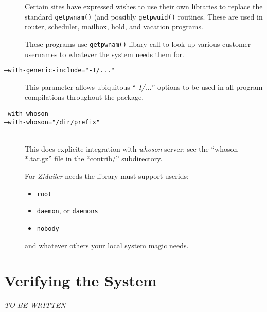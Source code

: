 \begin{description}
Certain sites have expressed wishes to use their own libraries
to replace the standard {\tt getpwnam()} (and possibly {\tt getpwuid()}
routines.
These are used in router, scheduler, mailbox, hold, and vacation
programs.

These programs use {\tt getpwnam()} libary call to look up
various customer usernames to whatever the system needs them
for.

\item[\tt --with-generic-include="-I/..."] \mbox{}

This parameter allows ubiquitous ``{\em -I/...}'' options to be used
in all program compilations throughout the package.

\item[\tt --with-whoson]
\item[\tt --with-whoson="/dir/prefix"] \mbox{} \\

This does explicite integration with {\em whoson} server; see
the ``whoson-*.tar.gz'' file in the ``contrib/'' subdirectory.

For {\em ZMailer} needs the library must support userids:
\begin{itemize}
\item {\tt root}
\item {\tt daemon}, or {\tt daemons}
\item {\tt nobody}
\end{itemize}
and whatever others your local system magic needs.
\end{description}

\section{Verifying the System}

{\em\large TO BE WRITTEN}


